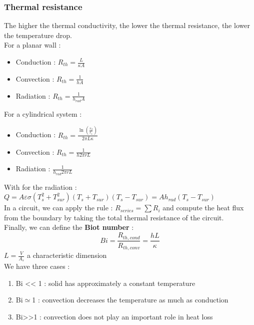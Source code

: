 \documentclass[../main.tex]{subfiles}
\begin{document}
\subsubsection{Thermal resistance}
The higher the thermal conductivity, the lower the thermal resistance, the lower the temperature drop.\\

For a planar wall : \begin{itemize}
    \item Conduction : $R_{th} = \frac{L}{\kappa A}$\\
    \item Convection : $R_{th} = \frac{1}{hA}$\\
    \item Radiation : $R_{th} = \frac{1}{h_{rad} A}$\\
\end{itemize}

For a cylindrical system : \begin{itemize}
    \item Conduction : $R_{th} = \frac{\ln(\frac{r_2}{r_1})}{2\pi L\kappa}$\\
    \item Convection : $R_{th} = \frac{1}{h 2\pi r L}$\\
    \item Radiation : $\frac{1}{h_{rad} 2\pi r L}$\\
\end{itemize}

With for the radiation : $Q = A \varepsilon \sigma (T_s^2 + T_{sur}^2)(T_s+T_{sur})(T_s-T_{sur}) = A h_{rad}(T_s-T_{sur})$\\

In a circuit, we can apply the rule : $R_{series} = \sum R_i$ and compute the heat flux from the boundary by taking the total thermal resistance of the circuit.\\

Finally, we can define the \textbf{Biot number} : \begin{equation}
    Bi = \frac{R_{th,cond}}{R_{th, conv}} = \frac{hL}{\kappa}
\end{equation}
\warning $L = \frac{V}{A_s}$ a characteristic dimension\\

We have three cases : \begin{enumerate}
    \item Bi << 1 : solid has approximately a constant temperature\\
    \item Bi$\simeq$1 : convection decreases the temperature as much as conduction\\
    \item Bi>>1 : convection does not play an important role in heat loss\\
\end{enumerate}
\end{document}
